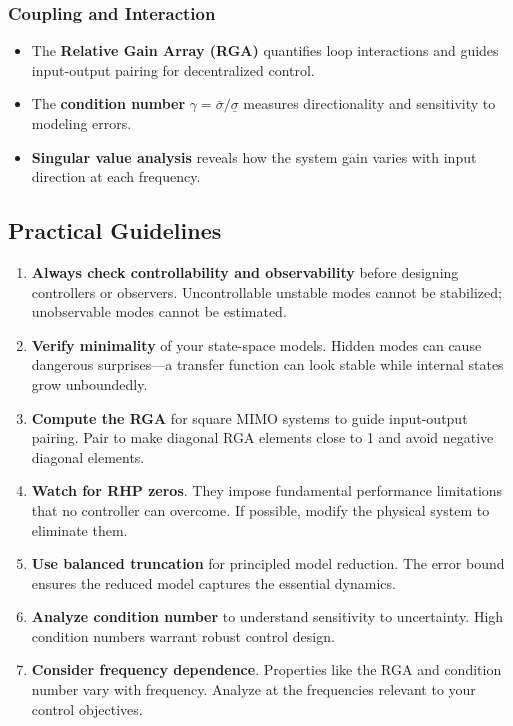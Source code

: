 \subsubsection{Coupling and Interaction}

\begin{itemize}
\item The \textbf{Relative Gain Array (RGA)} quantifies loop interactions and guides input-output pairing for decentralized control.

\item The \textbf{condition number} $\gamma = \bar{\sigma}/\underline{\sigma}$ measures directionality and sensitivity to modeling errors.

\item \textbf{Singular value analysis} reveals how the system gain varies with input direction at each frequency.
\end{itemize}

\subsection{Practical Guidelines}

\begin{enumerate}
\item \textbf{Always check controllability and observability} before designing controllers or observers. Uncontrollable unstable modes cannot be stabilized; unobservable modes cannot be estimated.

\item \textbf{Verify minimality} of your state-space models. Hidden modes can cause dangerous surprises---a transfer function can look stable while internal states grow unboundedly.

\item \textbf{Compute the RGA} for square MIMO systems to guide input-output pairing. Pair to make diagonal RGA elements close to 1 and avoid negative diagonal elements.

\item \textbf{Watch for RHP zeros}. They impose fundamental performance limitations that no controller can overcome. If possible, modify the physical system to eliminate them.

\item \textbf{Use balanced truncation} for principled model reduction. The error bound ensures the reduced model captures the essential dynamics.

\item \textbf{Analyze condition number} to understand sensitivity to uncertainty. High condition numbers warrant robust control design.

\item \textbf{Consider frequency dependence}. Properties like the RGA and condition number vary with frequency. Analyze at the frequencies relevant to your control objectives.
\end{enumerate}

